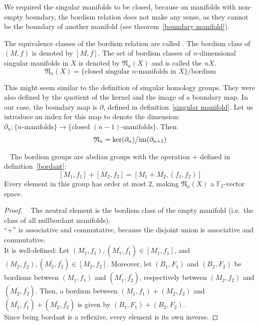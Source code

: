 \documentclass[a4paper,11pt]{article}
\begin{document}
\begin{remark}
    We required the singular manifolds to be closed, because on manifolds with non-empty boundary, the bordism relation does not make any sense, as they cannot be the boundary of another manifold (see theorem\ \ref{boundary manifold}).
\end{remark}

\begin{definition}
    The equivalence classes of the bordism relation are called . 
    The bordism class of \((M,f)\) is denoted by \([M,f]\). 
    The set of bordism classes of \(n\)-dimensional singular manifolds in \(X\) is denoted by \(\mathfrak{N}_n(X)\) and is called the \(n\)\(X\).
    \[\mathfrak{N}_n(X)=\{\text{closed singular \(n\)-manifolds in \(X\)}\}\big/\text{bordism}\]
\end{definition}

\begin{observation}
    This might seem similar to the definition of singular homology groups. They were also defined by the quotient of the kernel and the image of a boundary map.
    In our case, the boundary map is \(\partial\), defined in definition\ \ref{singular manifold}. Let us introduce an index for this map to denote the dimension: \(\partial_n:\{n\text{-manifolds}\}\to\{\text{closed }(n-1)\text{-manifolds}\}\).
    Then: \[\mathfrak{N}_n=\ker(\partial_n)\big/\mathrm{im}(\partial_{n+1})\]
\end{observation}

\begin{theorem}\ \cite[II, Satz 2.1]{brocker}
    The bordism groups are abelian groups with the operation \(+\) defined in definition\ \ref{bordant}:
    \[[M_1,f_1]+[M_2,f_2]=[M_1+M_2,(f_1,f_2)]\]
    Every element in this group has order at most \(2\), making \(\mathfrak{N}_n(X)\) a \(\mathbb{F}_2\)-vector space.
\end{theorem}

\begin{proof}
    \ \cite{brocker}
    The neutral element is the bordism class of the empty manifold (i.e.\ the class of all nullbordant manifolds).\\
    \enquote{+} is associative and commutative, because the disjoint union is associative and commutative.\\
    It is well-defined:
    Let \((M_1,f_1),(M_1^\prime,f_1^\prime)\in[M_1,f_1]\), and \((M_2,f_2),(M_2^\prime,f_2^\prime)\in[M_2,f_2]\).
    Moreover, let \((B_1,F_1)\) and \((B_2,F_2)\) be bordisms between \((M_1,f_1)\) and \((M_1^\prime,f_2^\prime)\), respectively between \((M_2,f_2)\) and \((M_2^\prime,f_2^\prime)\). Then, a bordism between \((M_1,f_1)+(M_2,f_2)\) and \((M_1^\prime,f_1^\prime)+(M_2^\prime,f_2^\prime)\) is given by \((B_1,F_1)+(B_2,F_2)\).\\
    Since being bordant is a reflexive, every element is its own inverse.
\end{proof}
\end{document}
